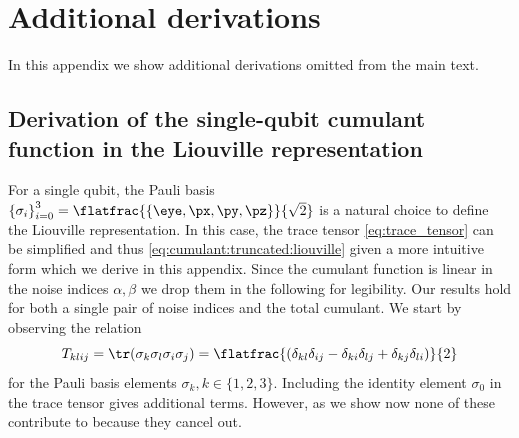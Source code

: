 \onecolumngrid
\appendix
\section{Additional derivations}\label{appsec:derivations:cumulant:pauli}
In this appendix we show additional derivations omitted from the main text.
\subsection{Derivation of the single-qubit cumulant function in the Liouville representation}
For a single qubit, the Pauli basis $\left\lbrace\sigma_i\right\rbrace_{i=0}^3 = \flatfrac{\left\lbrace\eye,\px,\py,\pz\right\rbrace}{\sqrt{2}}$ is a natural choice to define the Liouville representation. In this case, the trace tensor \cref{eq:trace_tensor} can be simplified and thus \cref{eq:cumulant:truncated:liouville} given a more intuitive form which we derive in this appendix. Since the cumulant function is linear in the noise indices $\alpha,\beta$ we drop them in the following for legibility. Our results hold for both a single pair of noise indices and the total cumulant. We start by observing the relation
\begin{equation}\label{eq:trace_tensor:four_paulis}
    T_{klij} = \tr(\sigma_k\sigma_l\sigma_i\sigma_j) = \flatfrac{(\delta_{kl}\delta_{ij} - \delta_{ki}\delta_{lj} + \delta_{kj}\delta_{li})}{2}
\end{equation}
for the Pauli basis elements $\sigma_k, k\in\lbrace 1, 2, 3\rbrace$. Including the identity element $\sigma_0$ in the trace tensor gives additional terms. However, as we show now none of these contribute to \cumulantfun because they cancel out.

